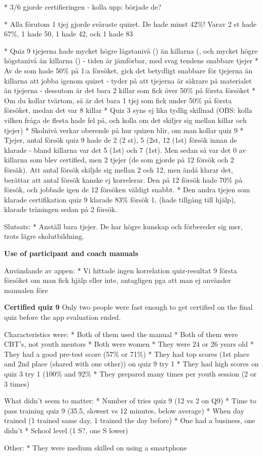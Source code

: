 * 3/6 gjorde certifieringen - kolla upp: började de?

* Alla förutom 1 tjej gjorde svåraste quizet. De hade minst 42\%! Varav 2 st hade 67\%, 1 hade 50, 1 hade 42, och 1 hade 83

* Quiz 9 tjejerna hade mycket högre lägstanivå () än killarna (, och mycket högre högstanivå än killarna () - tiden är jämförbar, med svag tendens snabbare tjejer
* Av de som hade 50\% på 1:a försöket, gick det betydligt snabbare för tjejerna än killarna att jobba igenom quizet - tyder på att tjejerna är säkrare på materialet än tjejerna - dessutom är det bara 2 killar som fick över 50\% på första försöket
* Om du kollar tvärtom, så är det bara 1 tjej som fick under 50\% på första försöket, medan det var 8 killar
* Quiz 3 syns ej lika tydlig skillnad (OBS: kolla vilken fråga de flesta hade fel på, och kolla om det skiljer sig mellan killar och tjejer)
* Skolnivå verkar oberende på hur quizen blir, om man kollar quiz 9
* Tjejer, antal försök quiz 9 hade de 2 (2 st), 5 (2st, 12 (1st) försök innan de klarade - bland killarna var det 5 (1st) och 7 (1st). Men sedan så var det 0 av killarna som blev certified, men 2 tjejer (de som gjorde på 12 försök och 2 försäk). Att antal försök skiljde sig mellan 2 och 12, men ändå klarar det, berättar att antal försök kanske ej korrelerar. Den på 12 försök hade 70\% på försök, och jobbade igen de 12 försöken väldigt snabbt.
* Den andra tjejen som klarade certifikation quiz 9 klarade 83\% försök 1, (hade tillgång till hjälp), klarade träningen sedan på 2 försök.

Slutsats:
* Anställ bara tjejer. De har högre kunskap och förbereder sig mer, trots lägre skolutbildning.

\textbf{Use of participant and coach manuals}

Användande av appen:
* Vi hittade ingen korrelation quiz-resultat 9 första försöket om man fick hjälp eller inte, antagligen pga att man ej använder manualen före

\textbf{Certified quiz 9}
Only two people were fast enough to get certified on the final quiz before the app evaluation ended.

Characteristics were:
* Both of them used the manual
* Both of them were CBT's, not youth mentors
* Both were women
* They were 24 or 26 years old
* They had a good pre-test score (57\% or 71\%)
* They had top scores (1st place and 2nd place (shared with one other)) on quiz 9 try 1
* They had high scores on quiz 3 try 1 (100\% and 92\%
* They prepared many times per youth session (2 or 3 times)

What didn't seem to matter:
* Number of tries quiz 9 (12 vs 2 on Q9)
* Time to pass training quiz 9 (35.5, slowest vs 12 minutes, below average)
* When day trained (1 trained same day, 1 trained the day before)
* One had a business, one didn't
* School level (1 S?, one S lower)

Other:
* They were medium skilled on using a smartphone
